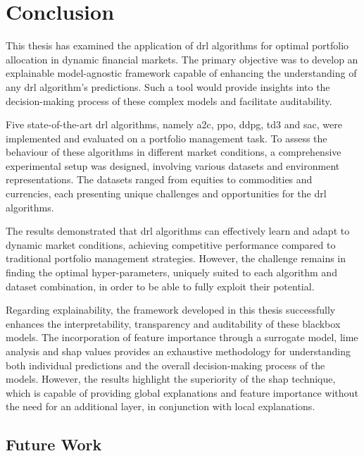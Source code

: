\chapter{Conclusion} \label{ch:conclusion}

This thesis has examined the application of \acrfull{drl} algorithms for optimal portfolio allocation in dynamic financial markets. The primary objective was to develop an explainable model-agnostic framework capable of enhancing the understanding of any \acrshort{drl} algorithm's predictions. Such a tool would provide insights into the decision-making process of these complex models and facilitate auditability.

Five state-of-the-art \acrshort{drl} algorithms, namely \acrfull{a2c}, \acrfull{ppo}, \acrfull{ddpg}, \acrfull{td3} and \acrfull{sac}, were implemented and evaluated on a portfolio management task. To assess the behaviour of these algorithms in different market conditions, a comprehensive experimental setup was designed, involving various datasets and environment representations. The datasets ranged from equities to commodities and currencies, each presenting unique challenges and opportunities for the \acrshort{drl} algorithms. 

The results demonstrated that \acrshort{drl} algorithms can effectively learn and adapt to dynamic market conditions, achieving competitive performance compared to traditional portfolio management strategies. However, the challenge remains in finding the optimal hyper-parameters, uniquely suited to each algorithm and dataset combination, in order to be able to fully exploit their potential.

Regarding explainability, the framework developed in this thesis successfully enhances the interpretability, transparency and auditability of these \gls{blackbox} models. The incorporation of feature importance through a surrogate model, \acrfull{lime} analysis and \acrfull{shap} values provides an exhaustive methodology for understanding both individual predictions and the overall decision-making process of the models. However, the results highlight the superiority of the \acrshort{shap} technique, which is capable of providing global explanations and feature importance without the need for an additional layer, in conjunction with local explanations. 

\section{Future Work} \label{sec:future-work}

